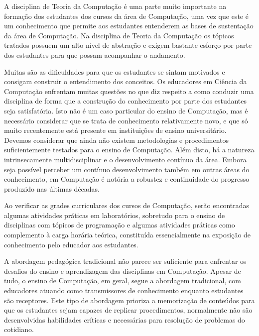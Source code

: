 \newcommand{\publicacaoTemplate}[2]{%
\textbf{#1} : #2}


\acresetall
\label{cap-introducao}
A disciplina de Teoria da Computação é uma parte muito importante
na formação dos estudantes dos cursos da área de Computação, uma 
vez que este é um conhecimento que permite aos estudantes
entenderem as bases de sustentação da área de Computação.
Na disciplina de Teoria da Computação os tópicos tratados
possuem um alto nível de abstração e exigem bastante esforço
por parte dos estudantes para que possam acompanhar o
andamento.

Muitas são as dificuldades para que os estudantes se sintam
motivados e consigam construir o entendimento dos conceitos.
Os educadores em Ciência da Computação enfrentam muitas questões no que diz
respeito a como conduzir uma disciplina de forma que a construção do conhecimento
por parte dos estudantes seja satisfatória.
Isto não é um caso particular do ensino de Computação,
mas é necessário considerar que se trata de
conhecimento relativamente novo, e que só muito
recentemente está presente em instituições de ensino universitário.
Devemos considerar que ainda não existem metodologias e procedimentos
suficientemente testados para o ensino de Computação.
Além disto, há a natureza intrinsecamente multidisciplinar e
o desenvolvimento contínuo da área.
Embora seja possível perceber um contínuo desenvolvimento também em
outras áreas do conhecimento, em Computação é notória a robustez e
continuidade do progresso produzido nas últimas décadas.



Ao verificar as grades curriculares dos cursos de Computação,
serão encontradas algumas atividades práticas em laboratórios,
sobretudo para o ensino de disciplinas com tópicos de programação e
algumas atividades práticas como complemento à carga horária teórica,
constituída essencialmente na exposição de conhecimento pelo educador
aos estudantes.

A abordagem pedagógica tradicional não parece ser suficiente para enfrentar
os desafios do ensino e aprendizagem das disciplinas
em Computação.
Apesar de tudo, o ensino de Computação, em geral, segue a abordagem
tradicional, com educadores atuando como transmissores de conhecimento
enquanto estudantes são receptores.
Este tipo de abordagem prioriza a memorização de conteúdos para
que os estudantes sejam capazes de replicar procedimentos,
normalmente não são desenvolvidas habilidades críticas e
necessárias para resolução de problemas do cotidiano.


